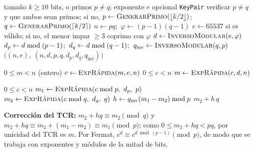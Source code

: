 \begin{algorithm}[H]
\caption{\textsc{GenerarClaves}$(k \text{ o } (p, q),\ e)$}
\begin{algorithmic}[1]
\Require tamaño $k \ge 10$ bits, o primos $p \neq q$; exponente $e$ opcional
\Ensure \texttt{KeyPair}
  \State verificar $p \neq q$ y que ambos sean primos; si no, 
\Else
  \Repeat
    \State $p \gets \textsc{GenerarPrimo}(\lfloor k/2 \rfloor)$;\ $q \gets \textsc{GenerarPrimo}(\lceil k/2 \rceil)$
\EndIf
\State $n \gets p q$;\ $\varphi \gets (p-1)(q-1)$
 $e \gets 65537$ si es válido; si no, el menor impar $\ge 3$ coprimo con $\varphi$ \EndIf
{}  \EndIf
\State $d \gets \textsc{InversoModular}(e, \varphi)$
\State $d_p \gets d \bmod (p-1)$;\ $d_q \gets d \bmod (q-1)$;\ $q_{\mathrm{inv}} \gets \textsc{InversoModular}(q, p)$
\State \Return $\big((n, e),\ (n, d, p, q, d_p, d_q, q_{\mathrm{inv}})\big)$
\end{algorithmic}
\end{algorithm}

\begin{minipage}[t]{0.45\textwidth}
\begin{algorithm}[H]
\caption{\textsc{Cifrar} / \textsc{Descifrar}}
\begin{algorithmic}[1]
\Require $0 \le m < n$ (entero)
\State $c \gets \textsc{ExpRápida}(m, e, n)$
\Statex
\Require $0 \le c < n$
\State $m \gets \textsc{ExpRápida}(c, d, n)$
\end{algorithmic}
\end{algorithm}
\end{minipage}\hfill
\begin{minipage}[t]{0.52\textwidth}
\begin{algorithm}[H]
\caption{\textsc{DescifrarTCR}$(c, \text{priv})$}\label{alg:tcr}
\begin{algorithmic}[1]
\Require $0 \le c < n$
\State $m_1 \gets \textsc{ExpRápida}(c \Mod p,\ d_p,\ p)$
\State $m_2 \gets \textsc{ExpRápida}(c \bmod q,\ d_q,\ q)$
\State $h \gets q_{\mathrm{inv}} (m_1 - m_2) \bmod p$ 
\State \Return $m_2 + h\, q$
\end{algorithmic}
\end{algorithm}
\end{minipage}

\medskip
\noindent\textbf{Corrección del TCR:} $m_2 + hq \equiv m_2 \pmod q$ y
$m_2 + hq \equiv m_2 + (m_1 - m_2) \equiv m_1 \pmod p$; como $0 \le m_2 + hq < pq$,
por unicidad del TCR es $m$. Por Fermat,
$c^{d} \equiv c^{d \bmod (p-1)} \pmod p$, de modo que se trabaja con
exponentes y módulos de la mitad de bits.

